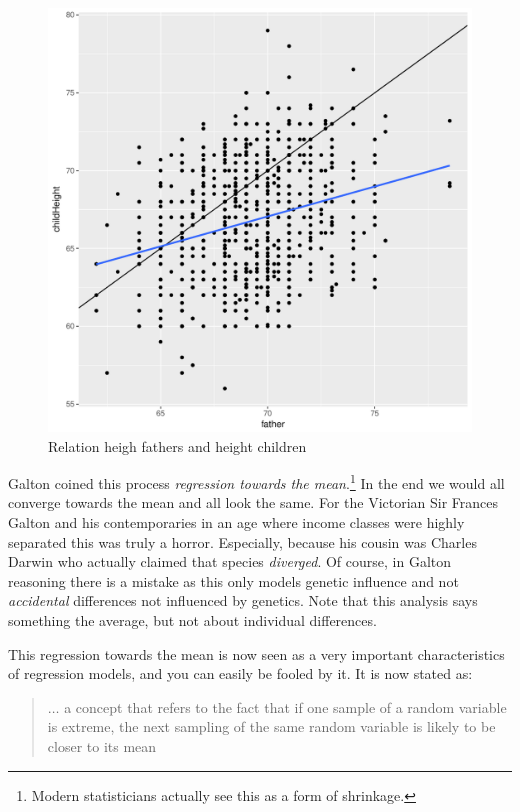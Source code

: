 \documentclass[
]{book}
\begin{document}
\begin{figure}

{\centering \includegraphics[width=600px]{./figures/Galton1} 

}

\caption{Relation heigh fathers and height children}\label{fig:galton1}
\end{figure}

Galton coined this process \emph{regression towards the mean}.\footnote{Modern statisticians actually see this as a form of shrinkage.} In the end we would all converge towards the mean and all look the same. For the Victorian Sir Frances Galton and his contemporaries in an age where income classes were highly separated this was truly a horror. Especially, because his cousin was Charles Darwin who actually claimed that species \emph{diverged}. Of course, in Galton reasoning there is a mistake as this only models genetic influence and not \emph{accidental} differences not influenced by genetics. Note that this analysis says something the average, but not about individual differences.

This regression towards the mean is now seen as a very important characteristics of regression models, and you can easily be fooled by it. It is now stated as:

\begin{quote}
\(\ldots\) a concept that refers to the fact that if one sample of a random variable is extreme, the next sampling of the same random variable is likely to be closer to its mean
\end{quote}
\end{document}
